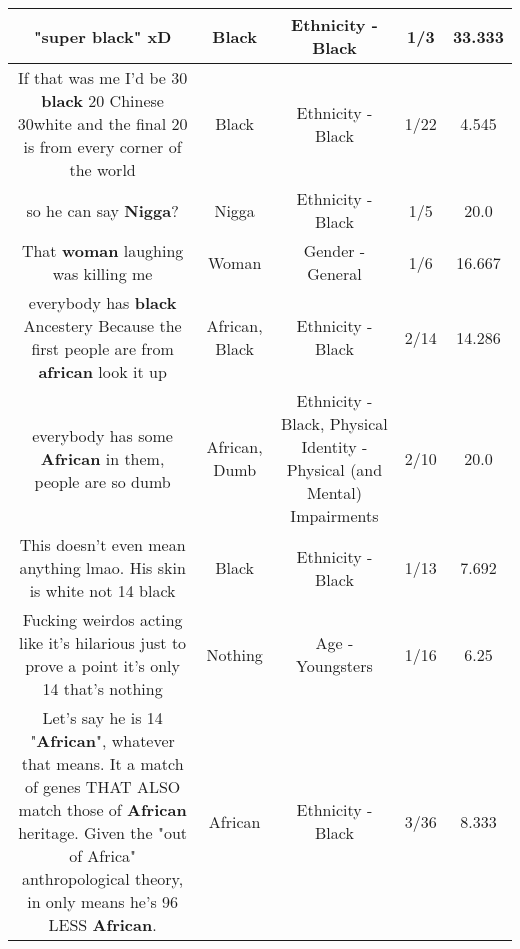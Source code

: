 \documentclass[11pt]{article}
\newlength\mylength
\begin{document}
\begin{center}
\begin{longtable}{|C{.65\mylength}|C{.30\mylength}|C{.12\mylength}|C{.12\mylength}|C{.12\mylength}|}
  \small "super \textbf{black}" xD\normalsize   & Black & Ethnicity - Black & 1/3 & 33.333 \\  \hline
  \small If that was me I'd be 30 \textbf{black} 20 Chinese 30white and the final 20 is from every corner of the world\normalsize   & Black & Ethnicity - Black & 1/22 & 4.545 \\  \hline
  \small so he can say \textbf{Nigga}?\normalsize   & Nigga & Ethnicity - Black & 1/5 & 20.0 \\  \hline
  \small That \textbf{woman} laughing was killing me\normalsize   & Woman & Gender - General & 1/6 & 16.667 \\  \hline
  \small everybody has \textbf{black} Ancestery Because the first people are from \textbf{african} look it up\normalsize   & African, Black & Ethnicity - Black & 2/14 & 14.286 \\  \hline
  \small everybody has some \textbf{African} in them, people are so dumb\normalsize   & African, Dumb & Ethnicity - Black, Physical Identity - Physical (and Mental) Impairments & 2/10 & 20.0 \\  \hline
  \small This doesn't even mean anything lmao. His skin is white not 14 black\normalsize   & Black & Ethnicity - Black & 1/13 & 7.692 \\  \hline
  \small Fucking weirdos acting like it's hilarious just to prove a point it's only 14 that's nothing\normalsize   & Nothing & Age - Youngsters & 1/16 & 6.25 \\  \hline
  \small Let's say he is 14  "\textbf{African}", whatever that means. It a match of genes THAT ALSO match those of \textbf{African} heritage. Given the "out of Africa" anthropological theory, in only means he's 96 LESS \textbf{African}.\normalsize   & African & Ethnicity - Black & 3/36 & 8.333 \\  \hline

\end{longtable}
\end{center}
\end{document}
